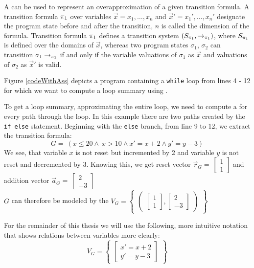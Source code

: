 A \qvasr can be used to represent an overapproximation of a given transition formula. A transition formula $\pi_1$ over variables $\vec{x} = x_1, \ldots, x_n$ and $\vec{x}' = x_1', \ldots, x_n'$ designate the program state before and after the transition, $n$ is called the dimension of the formula. Transition formula $\pi_1$ defines a transition system $(S_{\pi_1}, \rightarrow_{\pi_1})$, where $S_{\pi_1}$ is defined over the domains of $\vec{x}$, whereas two program states $\sigma_1$, $\sigma_2$ can transition $\sigma_1 \rightarrow_{\pi_1}$ if and only if the variable valuations of $\sigma_1$ as $\vec{x}$ and valuations of $\sigma_2$ as $\vec{x}'$ is valid. \\ \par
Figure \ref{codeWithAss} depicts a program containing a \texttt{while} loop from lines 4 - 12 for which we want to compute a loop summary using \qvasr. \par
To get a loop summary, approximating the entire loop, we need to compute a \qvasr for every path through the loop. In this example there are two paths created by the \texttt{if else} statement.
Beginning with the \texttt{else} branch, from line 9 to 12, we extract the transition formula:
\begin{equation*}
	G= \ (x \leq 20 \land\ x > 10 \land x' = x + 2 \land y' = y - 3)
\end{equation*}
We see, that variable $x$ is not reset but incremented by 2 and variable $y$ is not reset and decremented by 3.
Knowing this, we get reset vector $
\vec{r}_G = \  
\begin{bmatrix}
	1 \\
	1 
\end{bmatrix}
$
and addition vector $
\vec{a}_G = \ 
\begin{bmatrix}
	2 \\
	-3 
\end{bmatrix}$ \\
$G$ can therefore be modeled by the \qvasr
$V_G = 
\begin{Bmatrix}
	\begin{pmatrix}
		\begin{bmatrix}
			1 \\
			1
		\end{bmatrix},
		\begin{bmatrix}
			2 \\
			-3
		\end{bmatrix}
	\end{pmatrix}
\end{Bmatrix}
$ \par \vspace{2pt}
For the remainder of this thesis we will use the following, more intuitive notation that shows relations between variables more clearly:
\begin{equation*}
	V_G = 
	\begin{Bmatrix}
		\begin{bmatrix}
			x' = x + 2 \\
			y' = y - 3
		\end{bmatrix}
	\end{Bmatrix}
\end{equation*}
